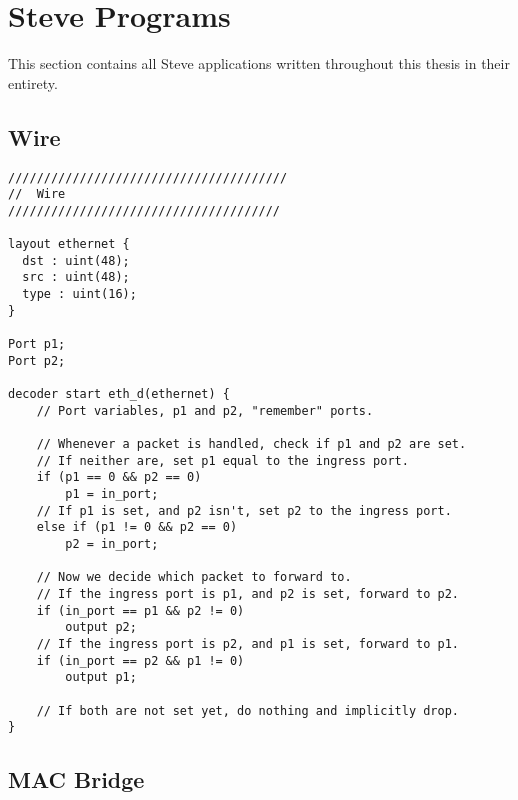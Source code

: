 \section{Steve Programs} \label{ap:steve_programs}

This section contains all Steve applications written throughout this thesis in their entirety.

\subsection{Wire}

\begin{lstlisting}
///////////////////////////////////////
//  Wire
//////////////////////////////////////

layout ethernet {
  dst : uint(48);
  src : uint(48);
  type : uint(16);
}

Port p1;
Port p2;

decoder start eth_d(ethernet) {
	// Port variables, p1 and p2, "remember" ports.

	// Whenever a packet is handled, check if p1 and p2 are set.
	// If neither are, set p1 equal to the ingress port.
	if (p1 == 0 && p2 == 0)
		p1 = in_port;
	// If p1 is set, and p2 isn't, set p2 to the ingress port.
	else if (p1 != 0 && p2 == 0)
		p2 = in_port;

	// Now we decide which packet to forward to.
	// If the ingress port is p1, and p2 is set, forward to p2.
	if (in_port == p1 && p2 != 0)
		output p2;
	// If the ingress port is p2, and p1 is set, forward to p1.
	if (in_port == p2 && p1 != 0)
		output p1;

	// If both are not set yet, do nothing and implicitly drop.
}
\end{lstlisting}

\subsection{MAC Bridge}

